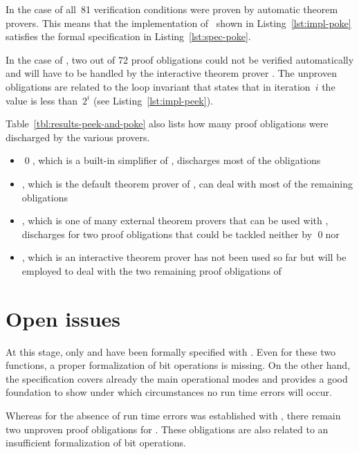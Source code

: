 In the case of \poke all~81 verification conditions were proven
by automatic theorem provers.
This means that the implementation of~\poke
shown in Listing~\ref{lst:impl-poke} satisfies the formal specification
in Listing~\ref{lst:spec-poke}.

In the case of \peek, two out of 72 proof obligations could not be
verified automatically and will have to be handled by the interactive
theorem prover \coq.
The unproven obligations are related to the loop invariant that
states that in iteration~$i$ the value  is less than~$2^i$
(see Listing~\ref{lst:impl-peek}).

Table~\ref{tbl:results-peek-and-poke} also lists how many proof
obligations were discharged by the various provers.

\begin{itemize}
\item \qed, which is a built-in simplifier of \framacwp, discharges most of the obligations

\item \altergo, which is the default theorem prover of \framacwp, can deal with
      most of the remaining obligations

\item \cvc, which is one of many external theorem provers that can be used with \framacwp,
      discharges for \poke two proof obligations that could be tackled neither by \qed nor \altergo

\item \coq, which is an interactive theorem prover has not been used so far but
      will be employed to deal with the two remaining proof obligations of \peek
\end{itemize}

\clearpage

\section{Open issues}
\label{sec:issues}

At this stage, only \peek and \poke have been formally specified with \acsl.
Even for these two functions, a proper formalization of bit operations is missing.
On the other hand, the specification covers already the main operational modes
and provides a good foundation to show under which
circumstances no run time errors will occur.

Whereas for \poke the absence of run time errors was established with \framacwp,
there remain two unproven proof obligations for \peek.
These obligations are also related to an insufficient formalization of
bit operations.

